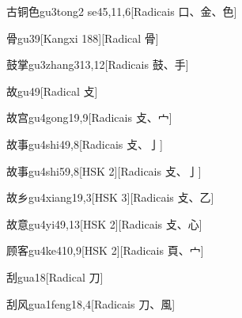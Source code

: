 \begin{entry}{古铜色}{gu3tong2 se4}{5,11,6}[Radicais ⼝、⾦、⾊]
\end{entry}

\begin{entry}{骨}{gu3}{9}[Kangxi 188][Radical ⾻]
\end{entry}

\begin{entry}{鼓掌}{gu3zhang3}{13,12}[Radicais ⿎、⼿]
\end{entry}

\begin{entry}{故}{gu4}{9}[Radical ⽁]
\end{entry}

\begin{entry}{故宫}{gu4gong1}{9,9}[Radicais ⽁、⼧]
\end{entry}

\begin{entry}{故事}{gu4shi4}{9,8}[Radicais ⽁、⼅]
\end{entry}

\begin{entry}{故事}{gu4shi5}{9,8}[HSK 2][Radicais ⽁、⼅]
\end{entry}

\begin{entry}{故乡}{gu4xiang1}{9,3}[HSK 3][Radicais ⽁、⼄]
\end{entry}

\begin{entry}{故意}{gu4yi4}{9,13}[HSK 2][Radicais ⽁、⼼]
\end{entry}

\begin{entry}{顾客}{gu4ke4}{10,9}[HSK 2][Radicais ⾴、⼧]
\end{entry}

\begin{entry}{刮}{gua1}{8}[Radical ⼑]
\end{entry}

\begin{entry}{刮风}{gua1feng1}{8,4}[Radicais ⼑、⾵]
\end{entry}

